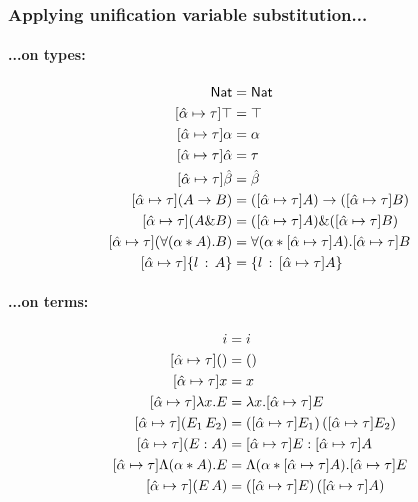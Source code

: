 \documentclass{article}
\newcommand{\mypar}[1]{\vspace{0.2cm}\paragraph{#1:} \hfill\vspace{0.1cm}}
\begin{document}
\subsubsection{Applying unification variable substitution...}
\begin{minipage}[t]{0.5\textwidth}
  \mypar{{...on types}}
  \begin{align*}
    [\unification{\alpha}{\tau}]\nat                  &= \nat\\
    [\unification{\alpha}{\tau}]\top                  &= \top\\
    [\unification{\alpha}{\tau}]\alpha                &= \alpha\\
    [\unification{\alpha}{\tau}]\hat\alpha            &= \tau\\
    [\unification{\alpha}{\tau}]\hat\beta             &= \hat\beta\\
    [\unification{\alpha}{\tau}](A\to B)              &= ([\unification{\alpha}{\tau}]A)\to([\unification{\alpha}{\tau}]B)\\
    [\unification{\alpha}{\tau}](A\& B)               &= ([\unification{\alpha}{\tau}]A)\&([\unification{\alpha}{\tau}]B)\\
    [\unification{\alpha}{\tau}](\Tabs{\alpha}{A}{B}) &= \Tabs{\alpha}{[\unification{\alpha}{\tau}]A}{[\unification{\alpha}{\tau}]B}\\
    [\unification{\alpha}{\tau}]\trecord{l}{A}        &= \trecord{l}{[\unification{\alpha}{\tau}]A}
  \end{align*}
\end{minipage}
\begin{minipage}[t]{0.5\textwidth}
  \mypar{{...on terms}}
  \begin{align*}
    [\unification{\alpha}{\tau}]i &= i\\
    [\unification{\alpha}{\tau}]() &= ()\\
    [\unification{\alpha}{\tau}]x &= x\\
    [\unification{\alpha}{\tau}]\abs{x}{E} &= \abs{x}{[\unification{\alpha}{\tau}]E}\\
    [\unification{\alpha}{\tau}](E_1\,E_2) &= ([\unification{\alpha}{\tau}]E_1)\,([\unification{\alpha}{\tau}]E_2)\\
    [\unification{\alpha}{\tau}](E : A) &= [\unification{\alpha}{\tau}]E : [\unification{\alpha}{\tau}]A\\
    [\unification{\alpha}{\tau}]\tabs{\alpha}{A}{E} &= \tabs{\alpha}{[\unification{\alpha}{\tau}]A}{[\unification{\alpha}{\tau}]E}\\
    [\unification{\alpha}{\tau}](E\,A) &= ([\unification{\alpha}{\tau}]E)\, ([\unification{\alpha}{\tau}]A)
  \end{align*}
\end{minipage}\\
\end{document}

